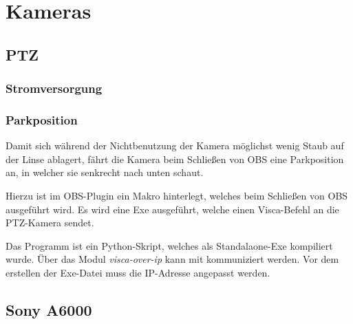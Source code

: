 \chapter{Kameras}
	\section{PTZ}
		\subsection{Stromversorgung}

		\subsection{Parkposition}\label{cam:ptz:park}
			Damit sich während der Nichtbenutzung der Kamera möglichst wenig Staub auf der Linse ablagert, fährt die Kamera beim Schließen von OBS eine Parkposition an, in welcher sie senkrecht nach unten schaut.

			Hierzu ist im \Gls{OBS}-Plugin ein Makro hinterlegt, welches beim Schließen von OBS ausgeführt wird.
			Es wird eine Exe ausgeführt, welche einen \Gls{Visca}-Befehl an die \Gls{PTZ-Kamera} sendet.

			Das Programm ist ein Python-Skript, welches als Standalaone-Exe kompiliert wurde.
			Über das Modul \textit{visca-over-ip} kann mit  kommuniziert werden.
			Vor dem erstellen der Exe-Datei muss die IP-Adresse angepasst werden.
	\section{Sony A6000}